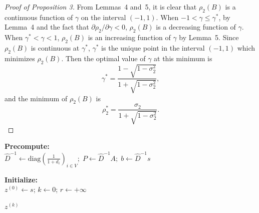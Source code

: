\documentclass[sigconf,review, nonacm]{acmart}
\begin{document}
\begin{proof}[Proof of Proposition 3]
From Lemmas~4 and~5, it is clear that $\rho_2(B)$ is a continuous function of
$\gamma$ on the interval $(-1,1)$. When $-1 < \gamma \le \gamma^{*}$, by Lemma~4 and the fact
that $\partial \rho_2 / \partial \gamma < 0$, $\rho_2(B)$ is a decreasing function
of $\gamma$. When $\gamma^{*} < \gamma < 1$, $\rho_2(B)$ is an increasing function of $\gamma$ by
Lemma~5. Since $\rho_2(B)$ is continuous at $\gamma^{*}$, $\gamma^{*}$ is the unique point
in the interval $(-1,1)$ which minimizes $\rho_2(B)$.
Then the optimal
value of $\gamma$ at this minimum is
\[
\gamma^{*} = \frac{1 - \sqrt{1 - \sigma_2^{2}}}{1 + \sqrt{1 - \sigma_2^{2}}},
\]
and the minimum of $\rho_2(B)$ is
\begin{equation}
\rho_2^{*}
= \frac{\sigma_2}{1 + \sqrt{1 - \sigma_2^{2}}}.
\end{equation}
\end{proof}

\begin{algorithm}
\label{{alg:memoiter}}
\caption{\textsc{SecondOrderIter}$(G,\, \gamma,\, \epsilon,\, T_{max})$}
\DontPrintSemicolon
{}


\BlankLine
\textbf{Precompute:} \\
$\displaystyle \widehat{D}^{-1} \gets \mathrm{diag}\!\left(\frac{1}{1+d_i}\right)_{i\in V};\; P \gets \widehat{D}^{-1} A;\; b \gets \widehat{D}^{-1} s$\;

\BlankLine
\textbf{Initialize:} \\
$z^{(0)} \gets s$; \quad
$k \gets 0$; \quad $r \gets +\infty$\;

\BlankLine
{}
\Return $z^{(k)}$\;

\end{algorithm}
\end{document}
